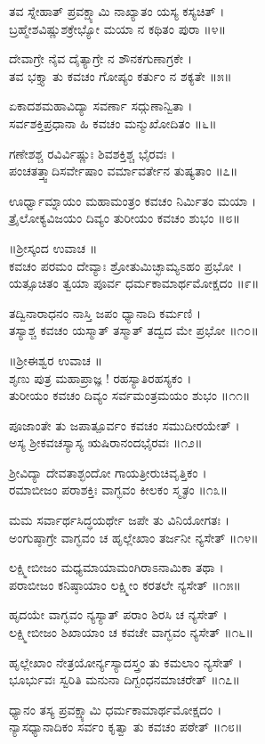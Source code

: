 ತವ ಸ್ನೇಹಾತ್ ಪ್ರವಕ್ಷ್ಯಾಮಿ ನಾಖ್ಯಾತಂ ಯಸ್ಯ ಕಸ್ಯಚಿತ್ ।\\
ಬ್ರಹ್ಮೇಶವಿಷ್ಣುಶಕ್ರೇಭ್ಯೋ ಮಯಾ ನ ಕಥಿತಂ ಪುರಾ ॥೪॥

ದೇವಾಗ್ರೇ ನೈವ ದೈತ್ಯಾಗ್ರೇ ನ ಶೌನಕಗುಣಾಗ್ರಕೇ ।\\
ತವ ಭಕ್ತ್ಯಾ ತು ಕವಚಂ ಗೋಪ್ಯಂ ಕರ್ತುಂ ನ ಶಕ್ಯತೇ ॥೫॥

ಏಕಾದಶಮಹಾವಿದ್ಯಾ ಸವರ್ಣಾ ಸದ್ಗುಣಾನ್ವಿತಾ ।\\
ಸರ್ವಶಕ್ತಿಪ್ರಧಾನಾ ಹಿ ಕವಚಂ ಮನ್ಮುಖೋದಿತಂ ॥೬॥

ಗಣೇಶಶ್ಚ ರವಿರ್ವಿಷ್ಣುಃ ಶಿವಶಕ್ತಿಶ್ಚ ಭೈರವಃ ।\\
ಪಂಚತತ್ತ್ವಾದಿಸರ್ವೇಷಾಂ ವರ್ಮಾವರ್ತೇನ ತುಷ್ಯತಾಂ ॥೭॥

ಊರ್ಧ್ವಾಮ್ನಾಯಂ ಮಹಾಮಂತ್ರಂ ಕವಚಂ ನಿರ್ಮಿತಂ ಮಯಾ ।\\
ತ್ರೈಲೋಕ್ಯವಿಜಯಂ ದಿವ್ಯಂ ತುರೀಯಂ ಕವಚಂ ಶುಭಂ ॥೮॥

॥ಶ್ರೀಸ್ಕಂದ ಉವಾಚ ॥\\
ಕವಚಂ ಪರಮಂ ದೇವ್ಯಾಃ ಶ್ರೋತುಮಿಚ್ಛಾಮ್ಯಽಹಂ ಪ್ರಭೋ ।\\
ಯತ್ಸೂಚಿತಂ ತ್ವಯಾ ಪೂರ್ವ ಧರ್ಮಕಾಮಾರ್ಥಮೋಕ್ಷದಂ ॥೯॥

ತದ್ವಿನಾರಾಧನಂ ನಾಸ್ತಿ ಜಪಂ ಧ್ಯಾನಾದಿ ಕರ್ಮಣಿ ।\\
ತಸ್ಯಾಶ್ಚ ಕವಚಂ ಯಸ್ಮಾತ್ ತಸ್ಮಾತ್ ತದ್ವದ ಮೇ ಪ್ರಭೋ ॥೧೦॥

॥ಶ್ರೀಈಶ್ವರ ಉವಾಚ ॥\\
ಶೃಣು ಪುತ್ರ ಮಹಾಪ್ರಾಜ್ಞ ! ರಹಸ್ಯಾತಿರಹಸ್ಯಕಂ ।\\
ತುರೀಯಂ ಕವಚಂ ದಿವ್ಯಂ ಸರ್ವಮಂತ್ರಮಯಂ ಶುಭಂ ॥೧೧॥

ಪೂಜಾಂತೇ ತು ಜಪಾತ್ಪೂರ್ವಂ ಕವಚಂ ಸಮುದೀರಯೇತ್ ।\\
ಅಸ್ಯ ಶ್ರೀಕವಚಸ್ಯಾಸ್ಯ ಋಷಿರಾನಂದಭೈರವಃ ॥೧೨॥

ಶ್ರೀವಿದ್ಯಾ ದೇವತಾಶ್ಛಂದೋ ಗಾಯತ್ರೀರುಚಿವೃತ್ತಿಕಂ ।\\
ರಮಾಬೀಜಂ ಪರಾಶಕ್ತಿಃ ವಾಗ್ಭವಂ ಕೀಲಕಂ ಸ್ಮೃತಂ ॥೧೩॥

ಮಮ ಸರ್ವಾರ್ಥಸಿದ್ಧಯರ್ಥೇ ಜಪೇ ತು ವಿನಿಯೋಗತಃ ।\\
ಅಂಗುಷ್ಠಾಗ್ರೇ ವಾಗ್ಭವಂ ಚ ಹೃಲ್ಲೇಖಾಂ ತರ್ಜನೀ ನ್ಯಸೇತ್ ॥೧೪॥

ಲಕ್ಷ್ಮೀಬೀಜಂ ಮಧ್ಯಮಾಯಾಮಂಗಿರಾಽನಾಮಿಕಾ ತಥಾ ।\\
ಪರಾಬೀಜಂ ಕನಿಷ್ಠಾಯಾಂ ಲಕ್ಷ್ಮೀಂ ಕರತಲೇ ನ್ಯಸೇತ್ ॥೧೫॥

ಹೃದಯೇ ವಾಗ್ಭವಂ ನ್ಯಸ್ಯಾತ್ ಪರಾಂ ಶಿರಸಿ ಚ ನ್ಯಸೇತ್ ।\\
ಲಕ್ಷ್ಮೀಬೀಜಂ ಶಿಖಾಯಾಂ ಚ ಕವಚೇ ವಾಗ್ಭವಂ ನ್ಯಸೇತ್ ॥೧೬॥

ಹೃಲ್ಲೇಖಾಂ ನೇತ್ರಯೋರ್ನ್ಯಸ್ಯಾದಸ್ತ್ರಂ ತು ಕಮಲಾಂ ನ್ಯಸೇತ್ ।\\
ಭೂರ್ಭುವಃ ಸ್ವರಿತಿ ಮನುನಾ ದಿಗ್ಬಂಧನಮಾಚರೇತ್ ॥೧೭॥

ಧ್ಯಾನಂ ತಸ್ಯ ಪ್ರವಕ್ಷ್ಯಾಮಿ ಧರ್ಮಕಾಮಾರ್ಥಮೋಕ್ಷದಂ ।\\
ನ್ಯಾಸಧ್ಯಾನಾದಿಕಂ ಸರ್ವಂ ಕೃತ್ವಾ ತು ಕವಚಂ ಪಠೇತ್ ॥೧೮॥


